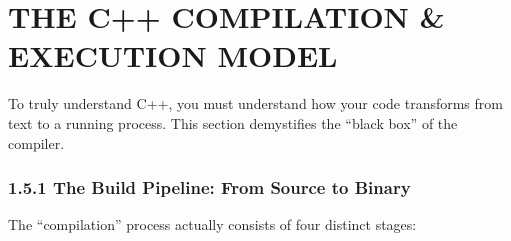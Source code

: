 \hypertarget{the-c-compilation-execution-model}{%
\section{THE C++ COMPILATION \& EXECUTION
MODEL}\label{the-c-compilation-execution-model}}

To truly understand C++, you must understand how your code transforms
from text to a running process. This section demystifies the ``black
box'' of the compiler.

\hypertarget{the-build-pipeline-from-source-to-binary}{%
\subsubsection{1.5.1 The Build Pipeline: From Source to
Binary}\label{the-build-pipeline-from-source-to-binary}}

The ``compilation'' process actually consists of four distinct stages:

